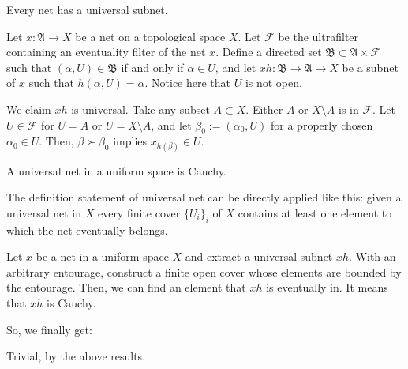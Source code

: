 \documentclass[12pt]{article}
\begin{document}
\begin{thm}
Every net has a universal subnet.
\end{thm}
\begin{pf}
Let $x:\mathfrak{A}\to X$ be a net on a topological space $X$.
Let $\mathcal{F}$ be the ultrafilter containing an eventuality filter of the net $x$.
Define a directed set $\mathfrak{B}\subset\mathfrak{A}\times\mathcal{F}$ such that $(\alpha,U)\in\mathfrak{B}$ if and only if $\alpha\in U$, and let $xh:\mathfrak{B}\to\mathfrak{A}\to X$ be a subnet of $x$ such that $h(\alpha,U)=\alpha$.
Notice here that $U$ is not open.

We claim $xh$ is universal.
Take any subset $A\subset X$.
Either $A$ or $X\setminus A$ is in $\mathcal{F}$.
Let $U\in\mathcal{F}$ for $U=A$ or $U=X\setminus A$, and let $\beta_0:=(\alpha_0,U)$ for a properly chosen $\alpha_0\in U$.
Then, $\beta\succ\beta_0$ implies $x_{h(\beta)}\in U$.
\end{pf}

\begin{thm}
A universal net in a uniform space is Cauchy.
\end{thm}
\begin{pf}
The definition statement of universal net can be directly applied like this: given a universal net in $X$ every finite cover $\{U_i\}_i$ of $X$ contains at least one element to which the net eventually belongs.

Let $x$ be a net in a uniform space $X$ and extract a universal subnet $xh$.
With an arbitrary entourage, construct a finite open cover whose elements are bounded by the entourage.
Then, we can find an element that $xh$ is eventually in.
It means that $xh$ is Cauchy.
\end{pf}

So, we finally get:

\begin{pf}[3 of Theorem 1.1.]
Trivial, by the above results.
\end{pf}




\end{document}
